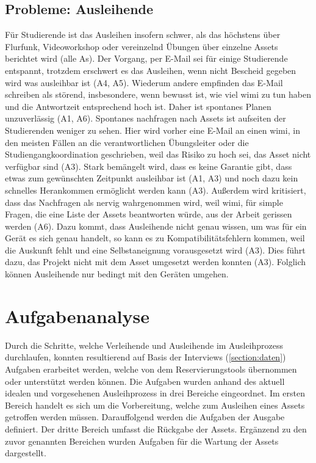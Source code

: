 \subsection{Probleme: Ausleihende}
\label{section:probleme-Ausleihende}
Für Studierende ist das Ausleihen insofern schwer, als das höchstens über Flurfunk, Videoworkshop
oder vereinzelnd Übungen über einzelne Assets berichtet wird (alle As). Der Vorgang, per E-Mail sei
für einige Studierende entspannt, trotzdem erschwert es das Ausleihen, wenn nicht Bescheid gegeben
wird was ausleihbar ist (A4, A5). Wiederum andere empfinden das E-Mail schreiben als störend,
insbesondere, wenn bewusst ist, wie viel \ac{wimi} zu tun haben und die Antwortzeit entsprechend
hoch ist. Daher ist spontanes Planen unzuverlässig (A1, A6). Spontanes nachfragen nach Assets ist
aufseiten der Studierenden weniger zu sehen. Hier wird vorher eine E-Mail an einen \ac{wimi}, in den
meisten Fällen an die verantwortlichen Übungsleiter oder die Studiengangkoordination geschrieben,
weil das Risiko zu hoch sei, das Asset nicht verfügbar sind (A3). Stark bemängelt wird, dass
es keine Garantie gibt, dass etwas zum gewünschten Zeitpunkt ausleihbar ist (A1, A3) und noch dazu
kein schnelles Herankommen ermöglicht werden kann (A3). Außerdem wird kritisiert, dass das
Nachfragen als nervig wahrgenommen wird, weil \ac{wimi}, für simple Fragen, die eine Liste der
Assets beantworten würde, aus der Arbeit gerissen werden (A6). Dazu kommt, dass Ausleihende nicht
genau wissen, um was für ein Gerät es sich genau handelt, so kann es zu Kompatibilitätsfehlern
kommen, weil die Auskunft fehlt und eine Selbstaneignung vorausgesetzt wird (A3). Dies führt dazu,
das Projekt nicht mit dem Asset umgesetzt werden konnten (A3). Folglich können Ausleihende nur
bedingt mit den Geräten umgehen.


\section{Aufgabenanalyse}
\label{section:aufgaben}
Durch die Schritte, welche Verleihende und Ausleihende im Ausleihprozess durchlaufen, konnten
resultierend auf Basis der Interviews (\ref{section:daten}) Aufgaben erarbeitet werden, welche von
dem Reservierungstools übernommen oder unterstützt werden können. Die Aufgaben wurden anhand des
aktuell idealen und vorgesehenen Ausleihprozess in drei Bereiche eingeordnet. Im ersten Bereich
handelt es sich um die Vorbereitung, welche zum Ausleihen eines Assets getroffen werden müssen.
Darauffolgend werden die Aufgaben der Ausgabe definiert. Der dritte Bereich umfasst die Rückgabe der
Assets. Ergänzend zu den zuvor genannten Bereichen wurden Aufgaben für die Wartung der Assets
dargestellt.

